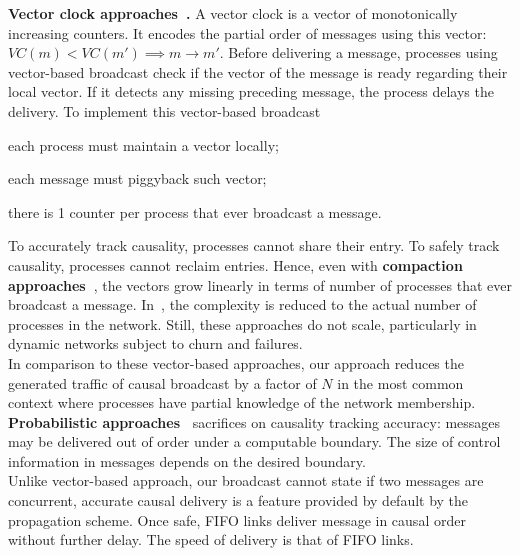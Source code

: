 \noindent \textbf{Vector clock
  approaches~\cite{fidge1988timestamps,mattern1989virtual}.}  A vector clock is
a vector of monotonically increasing counters.  It encodes the partial order of
messages using this vector: $VC(m) < VC(m') \implies m \rightarrow m'$.  Before
delivering a message, processes using vector-based broadcast check if the vector
of the message is ready regarding their local vector. If it detects any missing
preceding message, the process delays the delivery.  To implement this
vector-based broadcast
\begin{inparaenum}[(i)]
\item each process must maintain a vector locally;
\item each message must piggyback such vector;
\item there is 1 counter per process that ever broadcast a message.
\end{inparaenum}
To accurately track causality, processes cannot share their entry. To safely
track causality, processes cannot reclaim entries. Hence, even with
\textbf{compaction approaches~\cite{singhal1992efficient}}, the vectors grow
linearly in terms of number of processes that ever broadcast a message.
In~\cite{almeida2008interval}, the complexity is reduced to the actual number of
processes in the network.  Still, these approaches do not scale, particularly in
dynamic networks subject to churn and failures. \\
In comparison to these vector-based approaches, our approach reduces the
generated traffic of causal broadcast by a factor of $N$ in the most common
context where processes have partial knowledge of the network membership. \\
\textbf{Probabilistic approaches~\cite{mostefaoui2017probabilistic}} sacrifices
on causality tracking accuracy: messages may be delivered out of order under a
computable boundary. The size of control information in messages
depends on the desired boundary. \\
Unlike vector-based approach, our broadcast cannot state if two messages are
concurrent, accurate causal delivery is a feature provided by default by the
propagation scheme. Once safe, FIFO links deliver message in causal order
without further delay. The speed of delivery is that of FIFO links.


